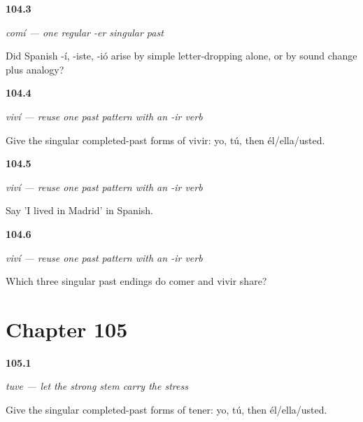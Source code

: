 \noindent\begin{minipage}[t]{\linewidth}
\raggedright
\hypertarget{review-ES-C15-comer-preterite-history}{\textbf{104.3}} \emph{comí — one regular -er singular past}\par
\small Did Spanish -í, -iste, -ió arise by simple letter-dropping alone, or by sound change plus analogy?
\end{minipage}\par\medskip

\noindent\begin{minipage}[t]{\linewidth}
\raggedright
\hypertarget{review-ES-C15-comer-vivir-preterite-vivir-forms}{\textbf{104.4}} \emph{viví — reuse one past pattern with an -ir verb}\par
\small Give the singular completed-past forms of vivir: yo, tú, then él/ella/usted.
\end{minipage}\par\medskip

\noindent\begin{minipage}[t]{\linewidth}
\raggedright
\hypertarget{review-ES-C15-comer-vivir-preterite-vivi-madrid}{\textbf{104.5}} \emph{viví — reuse one past pattern with an -ir verb}\par
\small Say 'I lived in Madrid' in Spanish.
\end{minipage}\par\medskip

\noindent\begin{minipage}[t]{\linewidth}
\raggedright
\hypertarget{review-ES-C15-comer-vivir-preterite-shared-endings}{\textbf{104.6}} \emph{viví — reuse one past pattern with an -ir verb}\par
\small Which three singular past endings do comer and vivir share?
\end{minipage}\par\medskip

\section*{Chapter 105}

\noindent\begin{minipage}[t]{\linewidth}
\raggedright
\hypertarget{review-ES-C15-tener-preterite-singular-forms}{\textbf{105.1}} \emph{tuve — let the strong stem carry the stress}\par
\small Give the singular completed-past forms of tener: yo, tú, then él/ella/usted.
\end{minipage}\par\medskip

